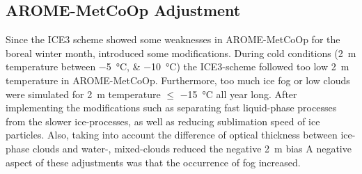 
%
\subsection{AROME-MetCoOp Adjustment}\label{sec:AROME:adjustment}
Since the ICE3 scheme showed some weaknesses in AROME-MetCoOp for the boreal winter month, \cite{muller_arome-metcoop:_2017} introduced some modifications. 
During cold conditions (\SI{2}{\metre} temperature between \SIlist{-5;-10}{\celsius}) the ICE3-scheme followed too low \SI{2}{\metre} temperature in AROME-MetCoOp. Furthermore, too much ice fog or low clouds were simulated for \SI{2}{\metre} temperature $\le$ \SI{-15}{\celsius} all year long. After implementing the modifications such as separating fast liquid-phase processes from the slower ice-processes, as well as reducing sublimation speed of ice particles. Also, taking into account the difference of optical thickness between ice-phase clouds and water-, mixed-clouds reduced the negative \SI{2}{\metre} bias \citep{muller_arome-metcoop:_2017} %
A negative aspect of these adjustments was that the occurrence of fog increased.%

